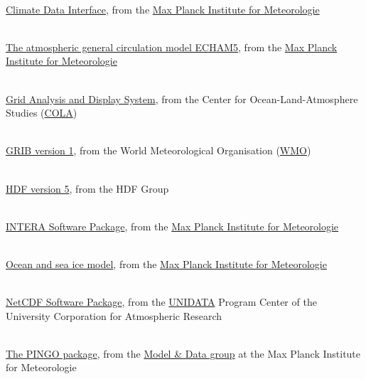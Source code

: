 \begin{thebibliography}{xx}

\label{CDI}
 \ \\
  \href{http://www.mpimet.mpg.de/cdi}
       {Climate Data Interface},
  from the
  \href{http://www.mpimet.mpg.de}
       {Max Planck Institute for Meteorologie}

\label{ECHAM}
 \ \\
  \href{http://www.mpimet.mpg.de/wissenschaft/publikationen/reports.html}
       {The atmospheric general circulation model ECHAM5},
  from the
  \href{http://www.mpimet.mpg.de}
       {Max Planck Institute for Meteorologie}

\label{GrADS}
 \ \\
  \href{http://www.iges.org/grads/}
       {Grid Analysis and Display System},
  from the Center for Ocean-Land-Atmosphere Studies
  (\href{http://www.iges.org/cola.html}{COLA})

\label{GRIB}
 \ \\
  \href{http://www.wmo.ch/web/www/WMOCodes/Guides/GRIB/GRIB1-Contents.html}
       {GRIB version 1},
  from the World Meteorological Organisation
  (\href{http://www.wmo.ch}{WMO})

\label{HDF5}
 \ \\
  \href{http://hdf.ncsa.uiuc.edu/HDF5/}
       {HDF version 5},
  from the HDF Group

\label{INTERA}
 \ \\
  \href{http://wekuw.met.fu-berlin.de/~IngoKirchner/nudging/nudging}{INTERA Software Package},
  from the
  \href{http://www.mpimet.mpg.de}
       {Max Planck Institute for Meteorologie}

\label{MPIOM}
 \ \\
  \href{http://www.mpimet.mpg.de/en/wissenschaft/modelle/mpiom/mpiom-description.html}
       {Ocean and sea ice model},
  from the
  \href{http://www.mpimet.mpg.de}
       {Max Planck Institute for Meteorologie}

\label{netCDF}
 \ \\
  \href{http://www.unidata.ucar.edu/packages/netcdf}{NetCDF Software Package},
  from the
  \href{http://www.unidata.ucar.edu}{UNIDATA}
  Program Center of the University Corporation for Atmospheric Research

\label{PINGO}
 \ \\
  \href{http://www.mad.zmaw.de/Pingo/post/down/BigPingo.pdf}{The PINGO package},
  from the
  \href{http://www.mad.zmaw.de}{Model \& Data group}
  at the Max Planck Institute for Meteorologie


\end{thebibliography}
